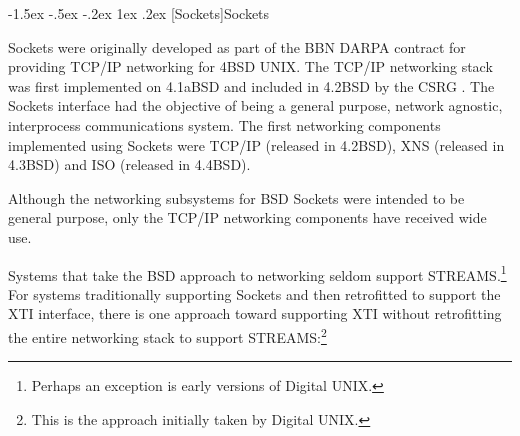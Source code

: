\documentclass[letterpaper,final,notitlepage,twocolumn,10pt,twoside]{article}
\makeatletter
\renewcommand\subsection{\@startsection{subsection}{2}{\z@}%
                                     {-1.5ex \@plus -.5ex \@minus -.2ex}%
                                     {1ex \@plus .2ex}%
                                     {\normalfont\normalsize\bfseries}}
\makeatother
\begin{document}
\subsection[Sockets]{Sockets}

Sockets were originally developed as part of the BBN DARPA contract for
providing TCP/IP networking for 4BSD UNIX.  The TCP/IP networking stack was
first implemented on 4.1aBSD and included in 4.2BSD by the CSRG \cite[]{bsd}.
The Sockets interface had the objective of being a general purpose, network
agnostic, interprocess communications system.  The first networking components
implemented using Sockets were TCP/IP (released in 4.2BSD), XNS (released in
4.3BSD) and ISO (released in 4.4BSD).

Although the networking subsystems for BSD Sockets were intended to be general
purpose, only the TCP/IP networking components have received wide use.

Systems that take the BSD approach to networking seldom support
STREAMS.\footnote{Perhaps an exception is early versions of Digital UNIX.}
For systems traditionally supporting Sockets and then retrofitted to support
the XTI interface, there is one approach toward supporting XTI without
retrofitting the entire networking stack to support STREAMS:\footnote{This is
the approach initially taken by Digital UNIX.}
\end{document}
